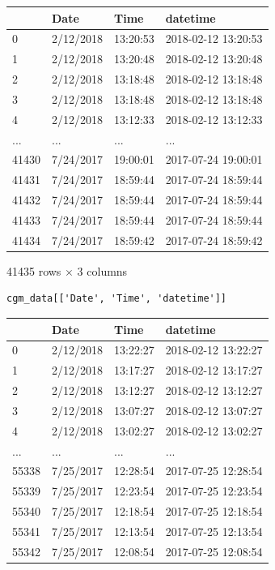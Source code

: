 \bigskip\noindent
\begin{tabular}{p{}p{}p{}p{}}
\toprule
 & Date & Time & datetime \\
\hline
0 & 2/12/2018 & 13:20:53 & 2018-02-12 13:20:53 \\
\hline
1 & 2/12/2018 & 13:20:48 & 2018-02-12 13:20:48 \\
\hline
2 & 2/12/2018 & 13:18:48 & 2018-02-12 13:18:48 \\
\hline
3 & 2/12/2018 & 13:18:48 & 2018-02-12 13:18:48 \\
\hline
4 & 2/12/2018 & 13:12:33 & 2018-02-12 13:12:33 \\
\hline
... & ... & ... & ... \\
\hline
41430 & 7/24/2017 & 19:00:01 & 2017-07-24 19:00:01 \\
\hline
41431 & 7/24/2017 & 18:59:44 & 2017-07-24 18:59:44 \\
\hline
41432 & 7/24/2017 & 18:59:44 & 2017-07-24 18:59:44 \\
\hline
41433 & 7/24/2017 & 18:59:44 & 2017-07-24 18:59:44 \\
\hline
41434 & 7/24/2017 & 18:59:42 & 2017-07-24 18:59:42 \\
\hline
\bottomrule
\end{tabular}

\bigskip

41435 rows $\times$ 3 columns

\begin{verbatim}
cgm_data[['Date', 'Time', 'datetime']]
\end{verbatim}

\bigskip\noindent
\begin{tabular}{p{}p{}p{}p{}}
\toprule
 & Date & Time & datetime \\
\hline
0 & 2/12/2018 & 13:22:27 & 2018-02-12 13:22:27 \\
\hline
1 & 2/12/2018 & 13:17:27 & 2018-02-12 13:17:27 \\
\hline
2 & 2/12/2018 & 13:12:27 & 2018-02-12 13:12:27 \\
\hline
3 & 2/12/2018 & 13:07:27 & 2018-02-12 13:07:27 \\
\hline
4 & 2/12/2018 & 13:02:27 & 2018-02-12 13:02:27 \\
\hline
... & ... & ... & ... \\
\hline
55338 & 7/25/2017 & 12:28:54 & 2017-07-25 12:28:54 \\
\hline
55339 & 7/25/2017 & 12:23:54 & 2017-07-25 12:23:54 \\
\hline
55340 & 7/25/2017 & 12:18:54 & 2017-07-25 12:18:54 \\
\hline
55341 & 7/25/2017 & 12:13:54 & 2017-07-25 12:13:54 \\
\hline
55342 & 7/25/2017 & 12:08:54 & 2017-07-25 12:08:54 \\
\hline
\bottomrule
\end{tabular}

